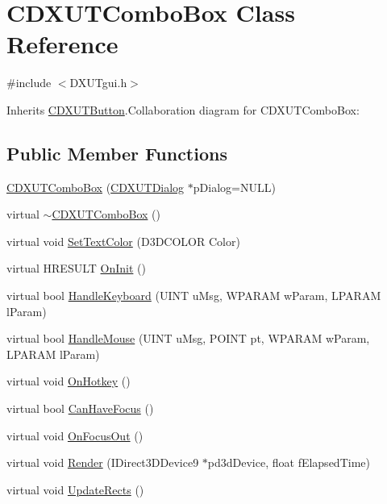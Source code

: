 \hypertarget{class_c_d_x_u_t_combo_box}{
\section{CDXUTComboBox Class Reference}
\label{class_c_d_x_u_t_combo_box}
}


{\ttfamily \#include $<$DXUTgui.h$>$}

Inherits \hyperlink{class_c_d_x_u_t_button}{CDXUTButton}.Collaboration diagram for CDXUTComboBox:\subsection*{Public Member Functions}
\begin{DoxyCompactItemize}
\item 
\hyperlink{class_c_d_x_u_t_combo_box_ab7f69be9c0bd5cee7b8057eb73db69c7}{CDXUTComboBox} (\hyperlink{class_c_d_x_u_t_dialog}{CDXUTDialog} $\ast$pDialog=NULL)
\item 
virtual \hyperlink{class_c_d_x_u_t_combo_box_ac4aa6d69b8f19e38d215ce9d749f2840}{$\sim$CDXUTComboBox} ()
\item 
virtual void \hyperlink{class_c_d_x_u_t_combo_box_ab023a8c2522432d14096f70fb902a0d4}{SetTextColor} (D3DCOLOR Color)
\item 
virtual HRESULT \hyperlink{class_c_d_x_u_t_combo_box_a57760cc904757ae273c297245743f3af}{OnInit} ()
\item 
virtual bool \hyperlink{class_c_d_x_u_t_combo_box_abe59d59e89767472038d69260ef73f9d}{HandleKeyboard} (UINT uMsg, WPARAM wParam, LPARAM lParam)
\item 
virtual bool \hyperlink{class_c_d_x_u_t_combo_box_a1cc659081f04fdf657f644d9970a7df8}{HandleMouse} (UINT uMsg, POINT pt, WPARAM wParam, LPARAM lParam)
\item 
virtual void \hyperlink{class_c_d_x_u_t_combo_box_a09eecfbd4d5173cf55c15c583b1a2209}{OnHotkey} ()
\item 
virtual bool \hyperlink{class_c_d_x_u_t_combo_box_a274c5f85816abf1d040ea1606bd3447c}{CanHaveFocus} ()
\item 
virtual void \hyperlink{class_c_d_x_u_t_combo_box_a513be57f0d60315b255ef11f5998c268}{OnFocusOut} ()
\item 
virtual void \hyperlink{class_c_d_x_u_t_combo_box_affcd25fdf9baf53e39e7b50e58ee05d4}{Render} (IDirect3DDevice9 $\ast$pd3dDevice, float fElapsedTime)
\item 
virtual void \hyperlink{class_c_d_x_u_t_combo_box_a2170bab00045ce0e43f2381d2c5f3648}{UpdateRects} ()

\end{DoxyCompactItemize}
